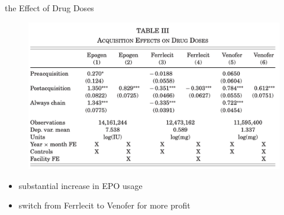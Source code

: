 \begin{frame}{the Effect of Drug Doses}
    \begin{figure}
        \centering
        \includegraphics[width=0.7\linewidth]{tb3.png}
    \end{figure}
    \begin{itemize}
        \item substantial increase in EPO usage
        \item switch from Ferrlecit to Venofer for more profit
    \end{itemize}
\end{frame}